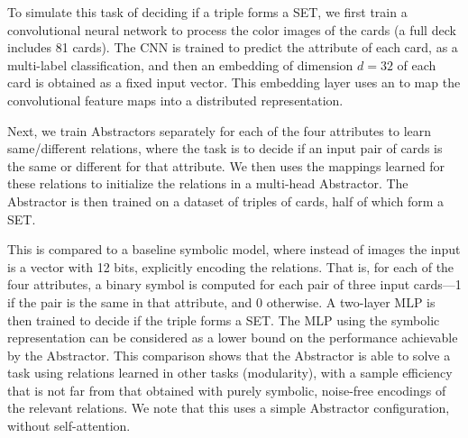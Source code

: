 To simulate this task of deciding if a triple forms a SET, we first train a convolutional neural network to process the color images of the cards (a full deck includes 81 cards). The CNN is trained to predict the attribute of
each card, as a multi-label classification, and then an embedding of dimension $d=32$ of 
each card is obtained as a fixed input vector. This embedding layer uses an \MLP{} to map the convolutional feature maps into a distributed representation.

Next, we train Abstractors separately for each of the four attributes to learn same/different 
relations, where the task is to decide if an input pair of cards is the same or different for that attribute. 
We then uses the mappings learned for these relations to initialize the relations
in a multi-head Abstractor. The Abstractor is then trained on a dataset of triples of cards, half of which form a SET. 

This is compared to a baseline symbolic model, where instead of images the input is a vector with 12 bits, explicitly encoding the relations. That is, for each of the four attributes, a binary symbol is computed for each pair of three input cards---1 if the pair is the same in that attribute, and 0 otherwise. A two-layer MLP is then trained to decide if the triple forms a SET. The MLP using the symbolic representation can be considered as a lower bound on the performance achievable by the Abstractor. This comparison shows that the Abstractor is able to solve a task using relations learned in other tasks (modularity), with a sample efficiency that is not far from that obtained 
with purely symbolic, noise-free encodings of the relevant relations. We note that this uses a simple Abstractor configuration, without self-attention.

